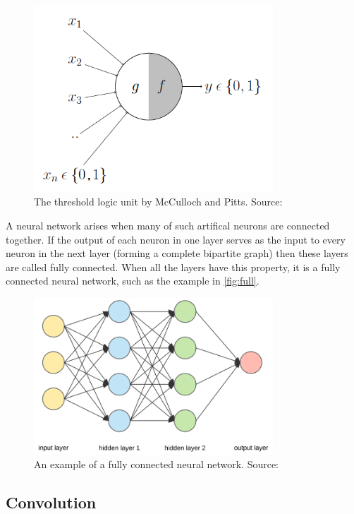 \begin{figure}
    \centering
    \includegraphics[width=0.8\textwidth]{images/mp.png}
    \caption{The threshold logic unit by McCulloch and Pitts. Source: \cite{med}}
    \label{fig:mp}
\end{figure}

A neural network arises when many of such artifical neurons are connected together. If the output of each neuron in one layer serves as the input to every neuron in the next layer (forming a complete bipartite graph) then these layers are called fully connected. When all the layers have this property, it is a fully connected neural network, such as the example in \autoref{fig:full}.\\

\begin{figure}
    \centering
    \includegraphics[width=0.8\textwidth]{images/fullyNet.png}
    \caption{An example of a fully connected neural network. Source: \cite{fullpic}}
    \label{fig:full}
\end{figure}

\subsection{Convolution}

